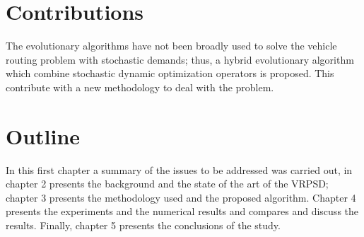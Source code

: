 \section{Contributions}

The evolutionary algorithms have not been broadly used to solve the vehicle routing problem with stochastic demands; thus, a hybrid evolutionary algorithm which combine stochastic dynamic optimization operators is proposed. This contribute with a new methodology to deal with the problem.

\section{Outline}

In this first chapter a summary of the issues to be addressed was carried out, in chapter 2 presents the background and the state of the art of the VRPSD; chapter 3 presents the methodology used and the proposed algorithm. Chapter 4 presents the experiments and the numerical results and compares and discuss the results. Finally, chapter 5 presents the conclusions of the study.

